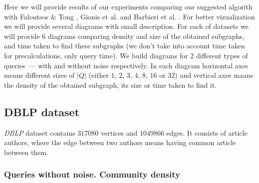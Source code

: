 Here we will provide results of our experiments comparing our suggested algorith with Faloutsos \& Tong \cite{Faloutsos06}, Gionis et al. \cite{Gionis15} and Barbieri et al. \cite{Barbieri15}. For better vizualization we will provide several diagrams with small description. For each of datasets we will provide $6$ diagrams comparing density and size of the obtained subgraphs, and time taken to find these subgraphs (we don't take into account time taken for precalculations, only query time). We build diagrams for $2$ different types of queries~--- with and without noise respectively. In each diagram horizontal axes means different sizes of $|Q|$ (either $1$, $2$, $3$, $4$, $8$, $16$ or $32$) and vertical axes maans the density of the obtained subgraph, its size or time taken to find it.

\subsection{DBLP dataset}

\textit{DBLP} dataset contains $317080$ vertices and $1049866$ edges. It consists of article authors, where the edge between two authors means having common article between them.

\subsubsection{Queries without noise. Community density}

  \begin{center}
  \end{center}

